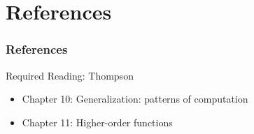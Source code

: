 \documentclass[dvipsnames]{beamer}
\theoremstyle{plain}
\begin{document}

\section*{References}

\begin{frame}
  \frametitle{References}

  \begin{block}{Required Reading: Thompson}
    \begin{itemize}
      \item Chapter 10: \alert{Generalization: patterns of computation}
      \item Chapter 11: \alert{Higher-order functions}
    \end{itemize}
  \end{block}
\end{frame}
\end{document}

